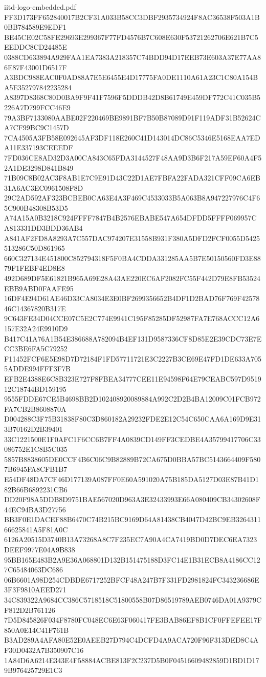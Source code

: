 \begin{filecontents*}[overwrite]{iitd-logo-embedded.pdf}
FF3D173FF652840017B2CF31A033B58CC3DBF2935734924F8AC36538F503A1B0BB784589E9EDF1
BE45CE02C58FE29693E299367F77FD4576B7C608E630F53721262706E621B7C5EEDDC8CD24485E
0388CD633894A929FAA1EA7383A218357C74BDD94D17EEB73E603A37E77AA86E87F43001D6517F
A3BDC988EAC0F0AD88A7E5E6455E4D17775FA0DE1110A61A23C1C80A154BA5E352797842235284
A8397D8368C80D0BA9F9F41F7596F5DDDB42D8B61749E459DF772C41C035B5226A7D799FCC46E9
79A3BF7133080AABE02F220469BE9891BF7B50B87089D91F119ADF31B52624CA7CF99BC9C1457D
7CA4505A3FB58E092645AF3DF118E260C41D143014DC86C5346E5168EAA7EDA11E337193CEEEDF
7FD036CE8AD32D3A00CA843C65FDA3144527F48AA9D3B6F217A59EF60A4F52A1DE3298D841B849
71B09C8B02AC3F8AB1E7C9E91D43C22D1AE7FBFA22FADA321CFF09CA6EB31A6AC3EC0961508F8D
29C2AD592AF323BCBEB0CA63E4A3F469C4533033B5A063B8A947227976C4F65C900B48308B53D5
A74A15A0B3218C924FFFF7847B4B2576EBABE547A654DFDD5FFFF069957CA813331DD3BDD36AB4
A841AF2FD8A8293A7C557DAC974207E31558B931F380A5DFD2FCF0055D5425513286C50D861965
660C327134E451800C852794318F5F0BA4CDDA331285AA5B7E50150560FD3E8879F1FEBF4ED8E8
492D689DF5E61821B965A69E28A43AE220EC6AF2082FC55F442D79E8FB53524EBB9ABD0FAAFE95
16DF4E94D61AE46D33CA8034E3E0BF2699356652B4DF1D2BAD76F769F4257846C14367820B317E
9C643FE34D04CCE07C5E2C774E9941C195F85285DF52987FA7E768ACCC12A6157E32A24E9910D9
B417C41A76A1B54E386688A782094B4EF131D9587336CF8D85E2E39CDC73E7ECC3BE6FA5C79252
F11452FCF6E5E98D7D72184F1FD57711721E3C2227B3CE69E47FD1DE633A7055ADDE994FFF3F7B
EFB2E4388E6C8B323E727F8FBEA34777CEE11E94598F64E79CEABC597D951912C18744BD159195
9555FDDE67CE5B4698BB2D102408920089884A992C2D2B4BA12009C01FCB972FA7CB2B8608870A
D004288C3F75B31838F80C3D860182A29232FDE2E12C54C650CAA6A169D9E313B70162D2B39401
33C1221500E1F0AFC1F6CC6B7FF4A0839CD149FF3CEDBE4A35799417706C33086752E1C8B5C035
5857B8838605DE0CCF4B6C06C9B82889B72CA675D0BBA57BC5143664409F5807B6945FA8CFB1B7
E54DF48DA7CF46D177139A087FF0E60A591020A75B185DA5127D03E87B41D182B66B6892231CB6
DD20F98A5DDB8D9751BAE567020D963A3E32433993E66A080409CB34302608F44EC94BA3D27756
BB3F0E1DACEF88B6470C74B215BC9169D64A81438CB4047D42BC9EB326431166625841A5F81A0C
6126A20515D3740B13A73268A8C7F235EC7A90A4CA7419BD0D7DEC6EA7323DEEF9977E04A9B838
95BB165E483B2A9E36A068801D132B151475188D3FC14E1B31ECB8A4186CC127C65484063DC686
06B6601A98D254CDBDE6717252BFCF48A247B7F331FD2981824FC343236686E3F3F9810AEED271
34C839322A9684CC386C5718518C51800558B07D86519789AEB0746DA01A9379CF812D2B761126
7D5D845826F034F8780FC048EC6E63F060417FE3BAB86EF8B1CF0FFEFEE17F850A0E14C41F761B
B3AD289A4AFA80E52E0AEEB27D794C4DCFD4A9ACA720F96F313DED8C4AF30D0432A7B350907C16
1A84D6A6214E343E4F58884ACBE813F2C237D5B0F04516609482859D1BD1D179B976425729E1C3

\end{filecontents*}

